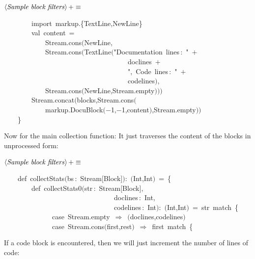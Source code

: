 \documentclass[a4paper,12pt]{article}
\begin{document}
$\left<\mbox{\emph{Sample block filters}}\right>+\equiv$
\begin{program}~~~~~~~~{\vem import}~markup.{\small\{}TextLine,NewLine{\small\}}
\\~~~~~~~~{\vem val}~content~=
\\~~~~~~~~~~~~Stream.cons$($NewLine,
\\~~~~~~~~~~~~Stream.cons$($TextLine$($"Documentation~lines\,{\rm :}~"~$+$
\\~~~~~~~~~~~~~~~~~~~~~~~~~~~~~~~~~~~~doclines~$+$
\\~~~~~~~~~~~~~~~~~~~~~~~~~~~~~~~~~~~~",~Code~lines\,{\rm :}~"~$+$
\\~~~~~~~~~~~~~~~~~~~~~~~~~~~~~~~~~~~~codelines$)$,
\\~~~~~~~~~~~~Stream.cons$($NewLine,Stream.empty$)$$)$$)$
\\~~~~~~~~Stream.concat$($blocks,Stream.cons$($
\\~~~~~~~~~~~~markup.DocuBlock$($$-$1,$-$1,content$)$,Stream.empty$)$$)$
\\~~~~{\small\}}
\\[0.5em]\end{program}
Now for the main collection function: It just traverses the
content of the blocks in unprocessed form:

$\left<\mbox{\emph{Sample block filters}}\right>+\equiv$
\begin{program}~~~~{\vem def}~collectStats$($bs\,{\rm :}~Stream$[$Block$]$$)${\rm :}~$($Int,Int$)$~=~{\small\{}
\\~~~~~~~~{\vem def}~collectStats0$($str\,{\rm :}~Stream$[$Block$]$,
\\~~~~~~~~~~~~~~~~~~~~~~~~~~~~~~~~doclines\,{\rm :}~Int,
\\~~~~~~~~~~~~~~~~~~~~~~~~~~~~~~~~codelines\,{\rm :}~Int$)${\rm :}~$($Int,Int$)$~=~str~{\vem match}~{\small\{}
\\~~~~~~~~~~~~~~{\vem case}~Stream.empty~$\Rightarrow$~$($doclines,codelines$)$
\\~~~~~~~~~~~~~~{\vem case}~Stream.cons$($first,rest$)$~$\Rightarrow$~first~{\vem match}~{\small\{}
\\[0.5em]\end{program}
If a code block is encountered, then we will just increment the
number of lines of code:
\end{document}
